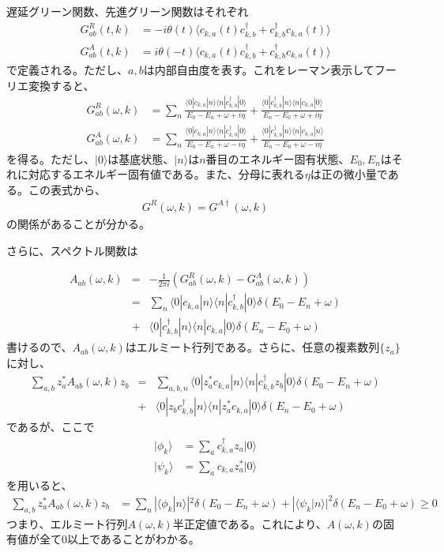 \documentclass[12pt]{jsbook}
\newcommand{\la}{\langle}
\newcommand{\ra}{\rangle}
\newcommand{\ca}{c_{k,a}}
\newcommand{\cad}{c_{k,a}^{\dagger}}
\newcommand{\cbd}{c_{k,b}^{\dagger}}
\begin{document}
遅延グリーン関数、先進グリーン関数はそれぞれ
\begin{eqnarray}
    G^R_{ab}(t,k) &= -i\theta(t)\langle c_{k,a}(t)c_{k,b}^{\dagger} + c_{k,b}^{\dagger}c_{k,a}(t)\rangle\\
G^A_{ab}(t,k) &= i\theta(-t)\langle c_{k,a}(t)c_{k,b}^{\dagger} + c_{k,b}^{\dagger}c_{k,a}(t)\rangle
\end{eqnarray}
で定義される。ただし、$a,b$は内部自由度を表す。これをレーマン表示してフーリエ変換すると、
\begin{eqnarray}
    G^R_{ab}(\omega,k) &= \displaystyle \sum_n \frac{\la 0|\ca |n\ra \la n| \cbd | 0\ra}{E_0-E_n + \omega + i\eta } + \frac{\la 0|\cbd |n\ra \la n| \ca |0\ra}{E_n - E_0 + \omega + i\eta}\\
G^A_{ab}(\omega,k) &= \displaystyle \sum_n \frac{\la 0|\ca |n\ra \la n | \cbd | 0\ra}{E_0-E_n + \omega -i\eta} + \frac{\la 0| \cbd |n \ra \la n | \ca | n\ra}{E_n - E_0 + \omega - i\eta}
\end{eqnarray}
を得る。ただし、$|0\ra$は基底状態、$|n\ra$は$n$番目のエネルギー固有状態、$E_0,E_n$はそれに対応するエネルギー固有値である。また、分母に表れる$\eta$は正の微小量である。この表式から、
\begin{eqnarray}
    G^R(\omega,k) = G^{A\dagger}(\omega,k)
\end{eqnarray}
の関係があることが分かる。

さらに、スペクトル関数は

\begin{eqnarray}
    A_{ab}(\omega,k)&=& -\frac{1}{2\pi i} (G^R_{ab}(\omega,k)-G^A_{ab}(\omega,k))\\
    &=&\displaystyle \sum_n \la 0|\ca|n\ra \la n|\cbd|0\ra \delta(E_0 - E_n + \omega) \\
    &+& \la 0|\cbd|n\ra\la n| \ca | 0\ra \delta (E_n-E_0 + \omega)
\end{eqnarray}
書けるので、$A_{ab}(\omega,k)$はエルミート行列である。さらに、任意の複素数列$\{z_a\}$に対し、
\begin{eqnarray}
    \displaystyle \sum_{a,b} z^*_a A_{ab}(\omega,k)z_b &=& \displaystyle \sum_{a,b,n} \la 0|z^*_a \ca |n\ra\la n | \cbd z_b |0\ra \delta(E_0-E_n + \omega) \\
    &+&  \la 0|z_b \cbd|n\ra\la n| z_a^*\ca | 0\ra \delta (E_n-E_0 + \omega)
\end{eqnarray}
であるが、ここで
\begin{align}
|\phi_k\ra &= \displaystyle \sum_a \cad z_a |0\ra\\ 
|\psi_k\ra &= \displaystyle \sum_a \ca z_a^* |0\ra
\end{align}
を用いると、
\begin{align}
\displaystyle \sum_{a,b} z^*_aA_{ab}(\omega,k)z_b &= \displaystyle \sum_n |\la \phi_k|n\ra|^2 \delta(E_0 - E_n + \omega) + |\la \psi_k|n\ra |^2\delta(E_n-E_0 + \omega)\geq 0
\end{align}
つまり、エルミート行列$A(\omega,k)$半正定値である。これにより、$A(\omega,k)$の固有値が全て0以上であることがわかる。
\end{document}
